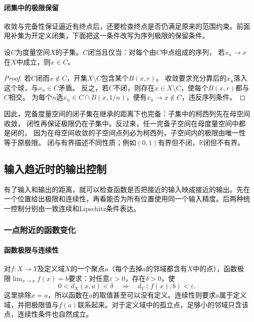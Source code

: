 \paragraph{闭集中的极限保留}

收敛与完备性保证逼近有终点后，还要检查终点是否仍满足原来的范围约束。前面用补集为开定义闭集，下面把这一条件改写为序列极限的保留条件。

\begin{lemma}[闭集的序列判据]
\label{lem:analysis-closed-sequence-criterion}
设$C$为度量空间$X$的子集。$C$闭当且仅当：对每个由$C$中点组成的序列，
若$x_n\to x$在$X$中成立，则$x\in C$。
\end{lemma}
\begin{proof}
若$C$闭而$x\notin C$，开集$X\setminus C$包含某个$B(x,r)$。
收敛要求充分靠后的$x_n$落入这个球，与$x_n\in C$矛盾。
反之，若$C$不闭，则存在$x\in X\setminus C$，使每个$B(x,r)$都与$C$相交。
为每个$n$选$x_n\in C\cap B(x,1/n)$，便有$x_n\to x\notin C$，违反序列条件。
\end{proof}

因此，完备度量空间的闭子集在继承的距离下也完备：子集中的柯西列先在母空间收敛，
闭性再保证极限仍在子集中。反过来，任一完备子空间在母度量空间中都是闭的，
因为在母空间收敛的子空间点列必为柯西列，子空间内的极限由唯一性等于原极限。
闭与有界描述不同性质；例如$(0,1)$有界但不闭，$\mathbb R$闭但不有界。

\subsection{输入趋近时的输出控制}
\label{sec:analysis-metric-continuity-extrema}

有了输入和输出的距离，就可以检查函数是否把接近的输入映成接近的输出。先在一个位置给出极限和连续性，再看能否为所有位置使用同一个输入精度。后两种统一控制分别由一致连续和Lipschitz条件表达。

\subsubsection{一点附近的函数变化}

\paragraph{函数极限与连续性}

对$f:X\to Y$及定义域$X$的一个聚点$a$（每个去掉$a$的邻域都含有$X$中的点），函数极限$\lim_{x\to a}f(x)=b$要求：对任意$\varepsilon>0$，存在$\delta>0$，使
\[
 0<d_X(x,a)<\delta\quad\Longrightarrow\quad d_Y(f(x),b)<\varepsilon.
\]
这里排除$x=a$，所以函数在$a$的取值甚至可以没有定义。连续性则要求$a$属于定义域，并把极限值与$f(a)$联系起来。对于定义域中的孤立点，足够小的邻域只含该点，连续性条件也自然成立。

